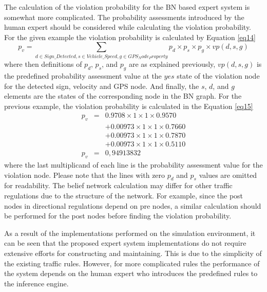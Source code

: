 \documentclass[a4paper,oneside,12pt]{report}
\begin{document}
The calculation of the violation probability for the BN based expert system is somewhat more complicated. The probability assessments introduced by the human expert should be considered while calculating the violation probability. For the given example the violation probability is calculated by Equation \ref{eq14}
\begin{equation}
\label{eq14}
	p_{v} = \sum_{d\in{Sign\_Detected},s\in{Vehicle\_Speed},g\in{GPS_Node_Property}}p_{d} \times p_{s} \times p_{g} \times vp(d,s,g)
\end{equation}
\noindent where then definitions of $p_{d}$, $p_{s}$, and $p_{g}$ are as explained previously, $vp(d,s,g)$ is the predefined probability assessment value at the $yes$ state of the violation node for the detected sign, velocity and GPS node. And finally, the $s$, $d$, and $g$ elements are the states of the corresponding node in the BN graph. For the previous example, the violation probability is calculated in the Equation \ref{eq15} 
\begin{eqnarray}
\label{eq15}
p_{v} &=& 0.9708 \times 1 \times 1 \times 0.9570 \\
\nonumber & & + 0.00973 \times 1 \times 1 \times 0.7660  \\
\nonumber & & + 0.00973 \times 1 \times 1 \times 0.7870  \\
\nonumber & & + 0.00973 \times 1 \times 1 \times 0.5110  \\
\nonumber p_{v} &=& 0,94913832
\end{eqnarray}
\noindent where the last multiplicand of each line is the probability assessment value for the violation node. Please note that the lines with zero $p_{d}$ and $p_{s}$ values are omitted for readability. The belief network calculation may differ for other traffic regulations due to the structure of the network. For example, since the post nodes in directional regulations depend on pre nodes, a similar calculation should be performed for the post nodes before finding the violation probability.

As a result of the implementations performed on the simulation environment, it can be seen that the proposed expert system implementations do not require extensive efforts for constructing and maintaining. This is due to the simplicity of the existing traffic rules. However, for more complicated rules the performance of the system depends on the human expert who introduces the predefined rules to the inference engine.
\end{document}
